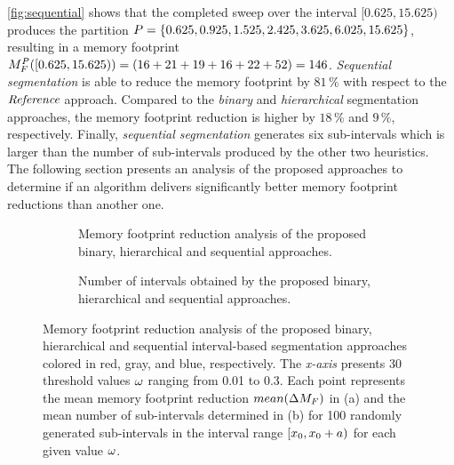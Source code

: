 \cref{fig:sequential} shows that the completed sweep over the interval $[0.625,15.625)$ produces the partition $P=\{0.625,0.925,1.525,2.425,3.625,6.025,15.625\}$, resulting in a memory footprint $M_{F}^P([0.625,15.625))=(16+21+19+16+22+52)=146$.
\textit{Sequential segmentation} is able to reduce the memory footprint by $81\,\%$ with respect to the $\textit{Reference}$ approach.
Compared to the \textit{binary} and \textit{hierarchical} segmentation approaches, the memory footprint reduction is higher by $18\,\%$ and $9\,\%$, respectively. 
Finally, \textit{sequential segmentation} generates six sub-intervals which is larger than the number of sub-intervals produced by the other two heuristics.\\
The following section presents an analysis of the proposed approaches to determine if an algorithm delivers significantly better memory footprint reductions than another one.
\begin{figure}[ht!]
	\centering
	\begin{subfigure}[b]{\textwidth}
		\centering
		\resizebox{0.76\textwidth}{!}{
			\begin{tikzpicture}
			\MeanPlots
			\end{tikzpicture}}
		\caption{\label{fig:mean_red}
			Memory footprint reduction analysis of the proposed binary, hierarchical and sequential approaches.}
	\end{subfigure}
	\begin{subfigure}[b]{\textwidth}
		\centering
                \vspace{0.5cm}
		\resizebox{0.76\textwidth}{!}{
			\begin{tikzpicture}
			\NIntervalPlots
			\end{tikzpicture}}
		\caption{\label{fig:mean_numInt} Number of intervals obtained by the proposed binary, hierarchical and sequential approaches.}
	\end{subfigure}
	\caption{\label{fig:compapps}Memory footprint reduction analysis of the proposed binary, hierarchical and sequential interval-based segmentation approaches colored in red, gray, and blue, respectively.
		The \textit{x-axis} presents 30 threshold values $\omega$ ranging from 0.01 to 0.3. 
		Each point represents the mean memory footprint reduction $mean(\Delta M_{F})$ in (a) and the mean number of sub-intervals determined in (b) for 100 randomly generated sub-intervals in the interval range $[x_{0},x_{0}+a)$ for each given value $\omega$.}
\end{figure}
